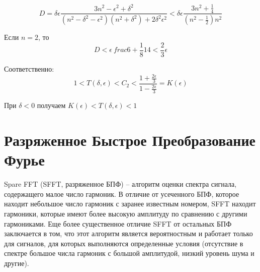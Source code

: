 \begin{equation}
	\label{eq:equation110}
	D = \delta \epsilon \frac{3n^2 - \epsilon^2 + \delta^2}{(n^2 - \delta^2 - \epsilon ^2)(n^2 + \delta ^2) + 2 \delta ^2 \epsilon^2} < \delta \epsilon \frac{3 n^2 + \frac{1}{4}}{(n^2 - \frac{1}{2})n^2}
\end{equation} 

Если $n = 2$, то
\begin{equation}
	\label{eq:equation111}
	D < \epsilon \ frac{6 + \frac{1}{8}}{14} < \frac{2}{3} \epsilon
\end{equation} 

Соответственно:
\begin{equation}
	\label{eq:equation112}
	1 < T(\delta, \epsilon) < C_{2} < \frac{1 + \frac{2 \epsilon}{3}}{1 - \frac{2 \epsilon}{3}} = K(\epsilon)
\end{equation} 

При $\delta <0$ получаем $K(\epsilon) < T(\delta, \epsilon) < 1$ 

\section{Разряженное Быстрое Преобразование Фурье} \label{sec:ch3/sect5}

Spare FFT (SFFT, разряженное БПФ) -- алгоритм оценки спектра сигнала, содержащего малое число гармоник. В отличие от усеченного БПФ, которое находит небольшое число гармоник с заранее известным номером, SFFT находит гармоники, которые имеют более высокую амплитуду по сравнению с другими гармониками. Еще более существенное отличие SFFT от остальных БПФ заключается в том, что этот алгоритм является вероятностным и работает только для сигналов, для которых выполняются определенные условия (отсутствие в спектре большое числа гармоник с большой амплитудой, низкий уровень шума и другие).

